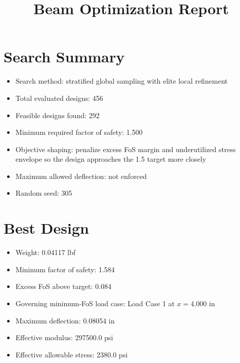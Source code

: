 \documentclass[11pt]{article}
\title{Beam Optimization Report}
\date{}
\begin{document}
\maketitle

\section*{Search Summary}
\begin{itemize}
\item Search method: stratified global sampling with elite local refinement
\item Total evaluated designs: 456
\item Feasible designs found: 292
\item Minimum required factor of safety: 1.500
\item Objective shaping: penalize excess FoS margin and underutilized stress envelope so the design approaches the 1.5 target more closely
\item Maximum allowed deflection: not enforced
\item Random seed: 305
\end{itemize}

\section*{Best Design}
\begin{itemize}
\item Weight: 0.04117 lbf
\item Minimum factor of safety: 1.584
\item Excess FoS above target: 0.084
\item Governing minimum-FoS load case: Load Case 1 at $x=4.000$ in
\item Maximum deflection: 0.08054 in
\item Effective modulus: 297500.0 psi
\item Effective allowable stress: 2380.0 psi
\end{itemize}
\end{document}
